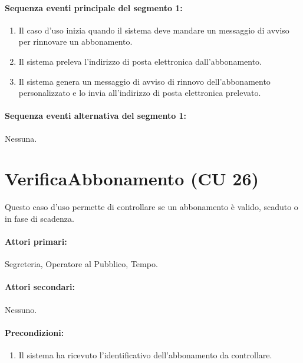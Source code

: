 \documentclass{article}
\begin{document}
	\paragraph{Sequenza eventi principale del segmento 1:}
		\begin{enumerate}[itemsep=8pt,parsep=0pt]
			\item Il caso d'uso inizia quando il sistema deve mandare un messaggio di avviso per rinnovare un abbonamento.
		        \item Il sistema preleva l'indirizzo di posta elettronica dall'abbonamento.
			\item Il sistema genera un messaggio di avviso di rinnovo dell'abbonamento personalizzato e lo invia all'indirizzo di posta elettronica prelevato.
             \end{enumerate}  		
	
	\paragraph{Sequenza eventi alternativa del segmento 1:} Nessuna.	
	
	
	
	
	
	
	
	
	\newpage

\section*{VerificaAbbonamento (CU 26)}
    
   \indent\indent  Questo caso d'uso permette di controllare se un abbonamento è valido, scaduto o in fase di scadenza.
    
    \paragraph{Attori primari:}Segreteria, Operatore al Pubblico, 	Tempo.
	
	\paragraph{Attori secondari:}Nessuno.
	
	\paragraph{Precondizioni:}
\begin{enumerate}[itemsep=8pt,parsep=0pt]
\item Il sistema ha ricevuto l'identificativo dell'abbonamento da controllare.
\end{enumerate}	
\end{document}
